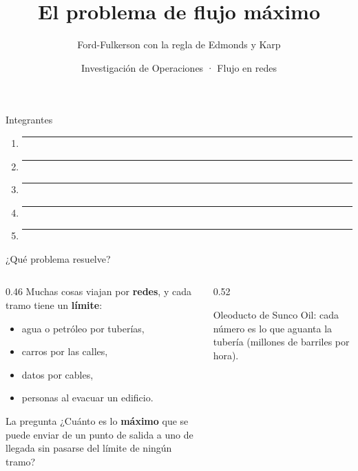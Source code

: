 \documentclass[aspectratio=169]{beamer}
\title{El problema de flujo máximo}
\subtitle{Ford-Fulkerson con la regla de Edmonds y Karp}
\author{Investigación de Operaciones · Flujo en redes}
\date{}
\newcommand{\ar}[4][arco]{\draw[#1] (#2) to node[etq, lbl] {#4} (#3);}
\newcommand{\nodosSunco}{%
  \node[fuente]   (so) at (0,-1)   {so};
  \node[nodo]     (n1) at (1.4,0)  {1};
  \node[nodo]     (n2) at (1.4,-2) {2};
  \node[nodo]     (n3) at (2.8,0)  {3};
  \node[sumidero] (si) at (4.2,-1) {si};}
\begin{document}
\begin{frame}
  \titlepage
\end{frame}

\begin{frame}{Integrantes}
  \vspace{1em}
  \begin{enumerate}\setlength{\itemsep}{1.2em}
    \item \rule{0.7\textwidth}{0.4pt}
    \item \rule{0.7\textwidth}{0.4pt}
    \item \rule{0.7\textwidth}{0.4pt}
    \item \rule{0.7\textwidth}{0.4pt}
    \item \rule{0.7\textwidth}{0.4pt}
  \end{enumerate}
\end{frame}

\begin{frame}{¿Qué problema resuelve?}
  \begin{columns}[T]
    \begin{column}{0.46\textwidth}
      Muchas cosas viajan por \textbf{redes}, y cada tramo tiene un \textbf{límite}:
      \begin{itemize}
        \item agua o petróleo por tuberías,
        \item carros por las calles,
        \item datos por cables,
        \item personas al evacuar un edificio.
      \end{itemize}
      \medskip
      \begin{block}{La pregunta}
        ¿Cuánto es lo \textbf{máximo} que se puede enviar de un punto de salida a uno de llegada sin pasarse
        del límite de ningún tramo?
      \end{block}
    \end{column}
    \begin{column}{0.52\textwidth}
      \centering

      \small Oleoducto de Sunco Oil: cada número es lo que aguanta la tubería (millones de barriles por hora).
    \end{column}
  \end{columns}
\end{frame}
\end{document}
